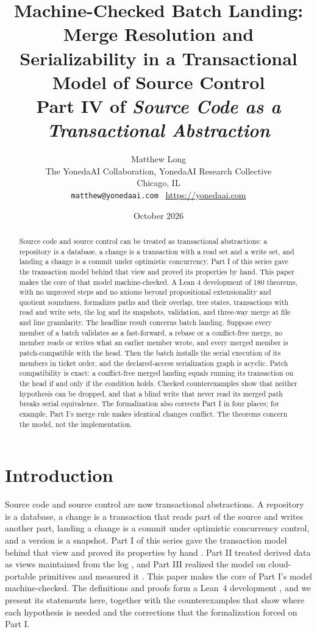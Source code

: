 \documentclass[11pt,letterpaper]{article}
\title{Machine-Checked Batch Landing: Merge Resolution and Serializability in a Transactional Model of Source Control\\[4pt]
  {\normalsize Part IV of \emph{Source Code as a Transactional Abstraction}}}
\author{Matthew Long\\
  \small The YonedaAI Collaboration, YonedaAI Research Collective\\
  \small Chicago, IL\\
  \small \texttt{matthew@yonedaai.com} \textperiodcentered\ \url{https://yonedaai.com}}
\date{October 2026}
\theoremstyle{definition}
\theoremstyle{remark}
\begin{document}
\maketitle

\begin{abstract}
Source code and source control can be treated as transactional abstractions: a repository is a database, a change is a transaction with a read set and a write set, and landing a change is a commit under optimistic concurrency. Part I of this series gave the transaction model behind that view and proved its properties by hand. This paper makes the core of that model machine-checked. A Lean 4 development of 180 theorems, with no unproved steps and no axioms beyond propositional extensionality and quotient soundness, formalizes paths and their overlap, tree states, transactions with read and write sets, the log and its snapshots, validation, and three-way merge at file and line granularity. The headline result concerns batch landing. Suppose every member of a batch validates as a fast-forward, a rebase or a conflict-free merge, no member reads or writes what an earlier member wrote, and every merged member is patch-compatible with the head. Then the batch installs the serial execution of its members in ticket order, and the declared-access serialization graph is acyclic. Patch compatibility is exact: a conflict-free merged landing equals running its transaction on the head if and only if the condition holds. Checked counterexamples show that neither hypothesis can be dropped, and that a blind write that never read its merged path breaks serial equivalence. The formalization also corrects Part I in four places; for example, Part I's merge rule makes identical changes conflict. The theorems concern the model, not the implementation.
\end{abstract}

\section{Introduction}
\label{sec:mcbl:intro}

Source code and source control are now transactional abstractions. A repository is a database, a change is a transaction that reads part of the source and writes another part, landing a change is a commit under optimistic concurrency control, and a version is a snapshot. Part I of this series gave the transaction model behind that view and proved its properties by hand \cite{long2026partI}. Part II treated derived data as views maintained from the log \cite{long2026partII}, and Part III realized the model on cloud-portable primitives and measured it \cite{long2026partIII}. This paper makes the core of Part I's model machine-checked. The definitions and proofs form a Lean~4 development \cite{demoura2021lean4}, and we present its statements here, together with the counterexamples that show where each hypothesis is needed and the corrections that the formalization forced on Part I.
\end{document}

